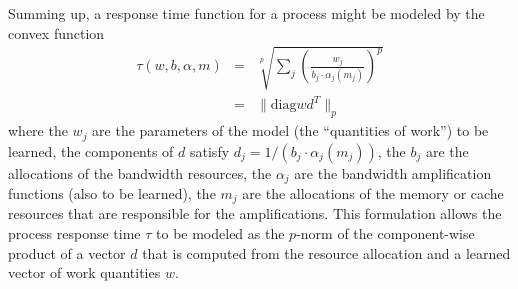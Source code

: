 Summing up, a response time function for a process might be modeled by the convex function
\begin{eqnarray*}
\tau(w,b,\alpha,m) &=& \sqrt[p]{\sum_j \left(\frac{w_j}{b_j\cdot\alpha_j(m_j)}\right)^p}  \\
                   &=& \|\mbox{diag} wd^T \|_p
\end{eqnarray*}
where the $w_j$ are the parameters of the model (the “quantities of work”) to be learned,
the components of $d$ satisfy $d_j = 1/(b_j\cdot\alpha_j(m_j))$,
the $b_j$  are the allocations of the bandwidth resources,
the $\alpha_j$ are the bandwidth amplification functions (also to be learned),
the $m_j$ are the allocations of the memory or cache resources that are responsible for the amplifications.
This formulation allows the process response time $\tau$ to be modeled as the $p$-norm of
the component-wise product of a vector $d$ that is computed from the resource allocation
and a learned vector of work quantities $w$.
